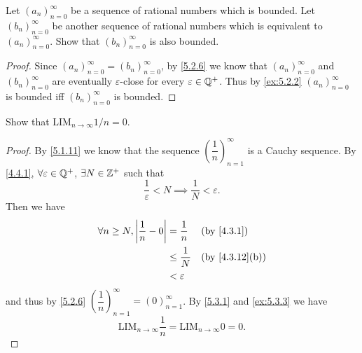 \begin{ex}\label{ex:5.3.4}
  Let \((a_n)_{n = 0}^{\infty}\) be a sequence of rational numbers which is bounded.
  Let \((b_n)_{n = 0}^{\infty}\) be another sequence of rational numbers which is equivalent to \((a_n)_{n = 0}^{\infty}\).
  Show that \((b_n)_{n = 0}^{\infty}\) is also bounded.
\end{ex}

\begin{proof}
  Since \((a_n)_{n = 0}^{\infty} = (b_n)_{n = 0}^{\infty}\), by \cref{5.2.6} we know that \((a_n)_{n = 0}^{\infty}\) and \((b_n)_{n = 0}^{\infty}\) are eventually \(\varepsilon\)-close for every \(\varepsilon \in \mathbb{Q}^+\).
  Thus by \cref{ex:5.2.2} \((a_n)_{n = 0}^{\infty}\) is bounded iff \((b_n)_{n = 0}^{\infty}\) is bounded.
\end{proof}

\begin{ex}\label{ex:5.3.5}
  Show that \(\text{LIM}_{n \to \infty} 1 / n = 0\).
\end{ex}

\begin{proof}
  By \cref{5.1.11} we know that the sequence \((\dfrac{1}{n})_{n = 1}^{\infty}\) is a Cauchy sequence.
  By \cref{4.4.1}, \(\forall \varepsilon \in \mathbb{Q}^+\), \(\exists N \in \mathbb{Z}^+\) such that
  \[
    \dfrac{1}{\varepsilon} < N \implies \dfrac{1}{N} < \varepsilon.
  \]
  Then we have
  \begin{align*}
    \forall n \geq N, \abs{\dfrac{1}{n} - 0} & = \dfrac{1}{n}    &  & \by{4.3.1}                   \\
                                             & \leq \dfrac{1}{N} &  & \text{(by \cref{4.3.12}(b))} \\
                                             & < \varepsilon
  \end{align*}
  and thus by \cref{5.2.6} \((\dfrac{1}{n})_{n = 1}^\infty = (0)_{n = 1}^\infty\).
  By \cref{5.3.1} and \cref{ex:5.3.3} we have
  \[
    \text{LIM}_{n \to \infty} \dfrac{1}{n} = \text{LIM}_{n \to \infty} 0 = 0.
  \]
\end{proof}
